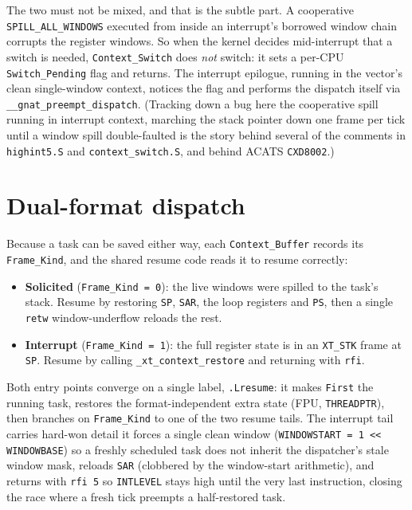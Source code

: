 The two must not be mixed, and that is the subtle part. A cooperative
\texttt{SPILL\_ALL\_WINDOWS} executed from inside an interrupt's borrowed window
chain corrupts the register windows. So when the kernel decides mid-interrupt that
a switch is needed, \texttt{Context\_Switch} does \emph{not} switch: it sets a
per-CPU \texttt{Switch\_Pending} flag and returns. The interrupt epilogue, running
in the vector's clean single-window context, notices the flag and performs the
dispatch itself via \texttt{\_\_gnat\_preempt\_dispatch}. (Tracking down a bug here
\textemdash{} the cooperative spill running in interrupt context, marching the
stack pointer down one frame per tick until a window spill double-faulted
\textemdash{} is the story behind several of the comments in \texttt{highint5.S}
and \texttt{context\_switch.S}, and behind ACATS \texttt{CXD8002}.)

\section{Dual-format dispatch}

Because a task can be saved either way, each \texttt{Context\_Buffer} records its
\texttt{Frame\_Kind}, and the shared resume code reads it to resume correctly:

\begin{itemize}
  \item \textbf{Solicited} (\texttt{Frame\_Kind = 0}): the live windows were
        spilled to the task's stack. Resume by restoring \texttt{SP}, \texttt{SAR},
        the loop registers and \texttt{PS}, then a single \texttt{retw} \textemdash{}
        window-underflow reloads the rest.
  \item \textbf{Interrupt} (\texttt{Frame\_Kind = 1}): the full register state is in
        an \texttt{XT\_STK} frame at \texttt{SP}. Resume by calling
        \texttt{\_xt\_context\_restore} and returning with \texttt{rfi}.
\end{itemize}

Both entry points converge on a single label, \texttt{.Lresume}: it makes
\texttt{First} the running task, restores the format-independent extra state (FPU,
\texttt{THREADPTR}), then branches on \texttt{Frame\_Kind} to one of the two
resume tails. The interrupt tail carries hard-won detail \textemdash{} it forces a
single clean window (\texttt{WINDOWSTART = 1 << WINDOWBASE}) so a freshly scheduled
task does not inherit the dispatcher's stale window mask, reloads \texttt{SAR}
(clobbered by the window-start arithmetic), and returns with \texttt{rfi 5} so
\texttt{INTLEVEL} stays high until the very last instruction, closing the race
where a fresh tick preempts a half-restored task.

